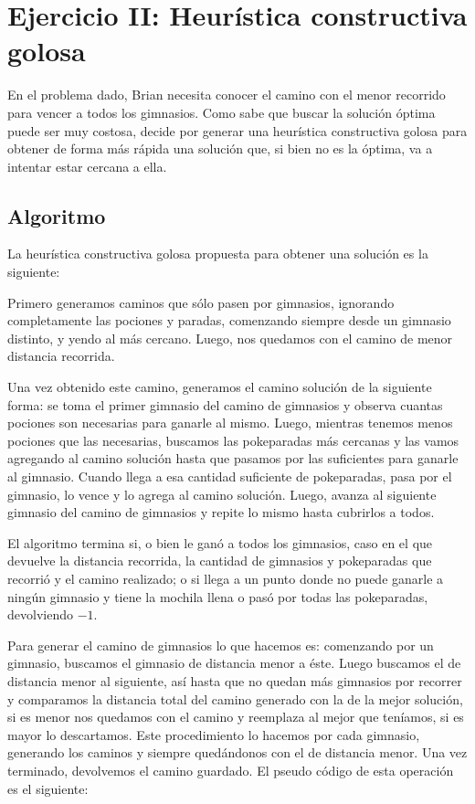 \section{Ejercicio II: Heurística constructiva golosa}

En el problema dado, Brian necesita conocer el camino con el menor recorrido para vencer a todos los gimnasios. Como sabe que buscar la solución óptima puede ser muy costosa, decide por generar una heurística constructiva golosa para obtener de forma más rápida una solución que, si bien no es la óptima, va a intentar estar cercana a ella.

\subsection{Algoritmo}

La heurística constructiva golosa propuesta para obtener una solución es la siguiente:

Primero generamos caminos que sólo pasen por gimnasios, ignorando completamente las pociones y paradas, comenzando siempre desde un gimnasio distinto, y yendo al más cercano. Luego, nos quedamos con el camino de menor distancia recorrida. 

Una vez obtenido este camino, generamos el camino solución de la siguiente forma: se toma el primer gimnasio del camino de gimnasios y observa cuantas pociones son necesarias para ganarle al mismo. Luego, mientras tenemos menos pociones que las necesarias, buscamos las pokeparadas más cercanas y las vamos agregando al camino solución hasta que pasamos por las suficientes para ganarle al gimnasio. Cuando llega a esa cantidad suficiente de pokeparadas, pasa por el gimnasio, lo vence y lo agrega al camino solución. Luego, avanza al siguiente gimnasio del camino de gimnasios y repite lo mismo hasta cubrirlos a todos.

El algoritmo termina si, o bien le ganó a todos los gimnasios, caso en el que devuelve la distancia recorrida, la cantidad de gimnasios y pokeparadas que recorrió y el camino realizado; o si llega a un punto donde no puede ganarle a ningún gimnasio y tiene la mochila llena o pasó por todas las pokeparadas, devolviendo $-1$.


Para generar el camino de gimnasios lo que hacemos es: comenzando por un gimnasio, buscamos el gimnasio de distancia menor a éste. Luego buscamos el de distancia menor al siguiente, así hasta que no quedan más gimnasios por recorrer y comparamos la distancia total del camino generado con la de la mejor solución, si es menor nos quedamos con el camino y reemplaza al mejor que teníamos, si es mayor lo descartamos. Este procedimiento lo hacemos por cada gimnasio, generando los caminos y siempre quedándonos con el de distancia menor. Una vez terminado, devolvemos el camino guardado. El pseudo código de esta operación es el siguiente:

